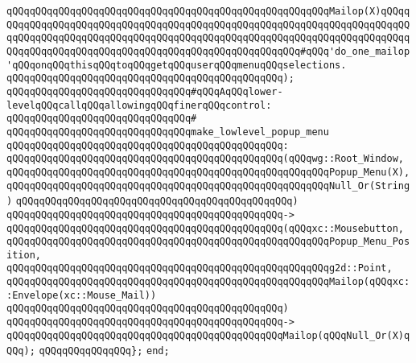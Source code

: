 \verb|qQQqqQQqqQQqqQQqqQQqqQQqqQQqqQQqqQQqqQQqqQQqqQQqqQQqqQQqMailop(X)qQQqqQQqqQQqqQQqqQQqqQQqqQQqqQQqqQQqqQQqqQQqqQQqqQQqqQQqqQQqqQQqqQQqqQQqqQQqqQQqqQQqqQQqqQQqqQQqqQQqqQQqqQQqqQQqqQQqqQQqqQQqqQQqqQQqqQQqqQQqqQQqqQQqqQQqqQQqqQQqqQQqqQQqqQQqqQQqqQQqqQQqqQQqqQQqqQQq#qQQq'do_one_mailop'qQQqonqQQqthisqQQqtoqQQqgetqQQquserqQQqmenuqQQqselections.|\newline
\verb|qQQqqQQqqQQqqQQqqQQqqQQqqQQqqQQqqQQqqQQqqQQqqQQq);|\newline
\newline
\verb|qQQqqQQqqQQqqQQqqQQqqQQqqQQqqQQq#qQQqAqQQqlower-levelqQQqcallqQQqallowingqQQqfinerqQQqcontrol:|\newline
\verb|qQQqqQQqqQQqqQQqqQQqqQQqqQQqqQQq#|\newline
\verb|qQQqqQQqqQQqqQQqqQQqqQQqqQQqqQQqmake_lowlevel_popup_menu|\newline
\verb|qQQqqQQqqQQqqQQqqQQqqQQqqQQqqQQqqQQqqQQqqQQqqQQq:|\newline
\verb|qQQqqQQqqQQqqQQqqQQqqQQqqQQqqQQqqQQqqQQqqQQqqQQq(qQQqwg::Root_Window,|\newline
\verb|qQQqqQQqqQQqqQQqqQQqqQQqqQQqqQQqqQQqqQQqqQQqqQQqqQQqqQQqPopup_Menu(X),|\newline
\verb|qQQqqQQqqQQqqQQqqQQqqQQqqQQqqQQqqQQqqQQqqQQqqQQqqQQqqQQqNull_Or(String)|\newline
\verb|qQQqqQQqqQQqqQQqqQQqqQQqqQQqqQQqqQQqqQQqqQQqqQQq)|\newline
\verb|qQQqqQQqqQQqqQQqqQQqqQQqqQQqqQQqqQQqqQQqqQQqqQQq->|\newline
\verb|qQQqqQQqqQQqqQQqqQQqqQQqqQQqqQQqqQQqqQQqqQQqqQQq(qQQqxc::Mousebutton,|\newline
\verb|qQQqqQQqqQQqqQQqqQQqqQQqqQQqqQQqqQQqqQQqqQQqqQQqqQQqqQQqPopup_Menu_Position,|\newline
\verb|qQQqqQQqqQQqqQQqqQQqqQQqqQQqqQQqqQQqqQQqqQQqqQQqqQQqqQQqg2d::Point,|\newline
\verb|qQQqqQQqqQQqqQQqqQQqqQQqqQQqqQQqqQQqqQQqqQQqqQQqqQQqqQQqMailop(qQQqxc::Envelope(xc::Mouse_Mail))|\newline
\verb|qQQqqQQqqQQqqQQqqQQqqQQqqQQqqQQqqQQqqQQqqQQqqQQq)|\newline
\verb|qQQqqQQqqQQqqQQqqQQqqQQqqQQqqQQqqQQqqQQqqQQqqQQq->|\newline
\verb|qQQqqQQqqQQqqQQqqQQqqQQqqQQqqQQqqQQqqQQqqQQqqQQqMailop(qQQqNull_Or(X)qQQq);|\newline
\newline
\verb|qQQqqQQqqQQqqQQq};|\newline
\verb|end;|\newline
